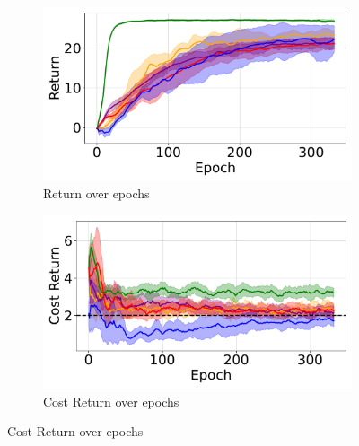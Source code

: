 \begin{figure}[H]
\begin{minipage}{0.48\textwidth}
        \caption*{Cost return limit: 1.5}
    \end{minipage}
    \hfill
    \begin{minipage}{0.48\textwidth}
        \centering
        \begin{subfigure}{\linewidth}
            \centering
            \includegraphics[width=\linewidth]{figure/PointGoal/limit 2/EpRet.pdf}
            \caption{Return over epochs}
        \end{subfigure}

        \begin{subfigure}{\linewidth}
            \centering
            \includegraphics[width=\linewidth]{figure/PointGoal/limit 2/EpCost.pdf}
            \caption{Cost Return over epochs}
        \end{subfigure}


\end{minipage}
\end{figure}
